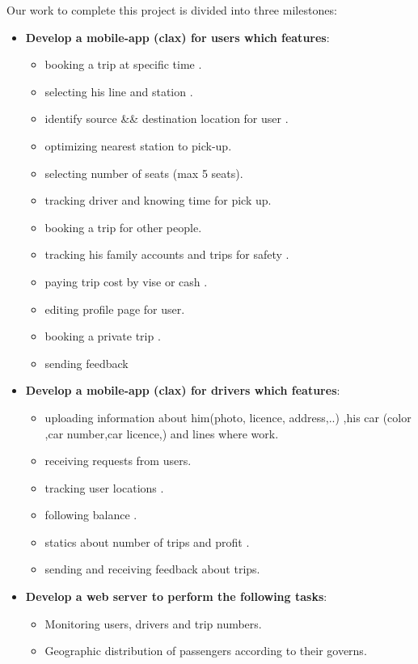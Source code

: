 Our work to complete this project is divided into three milestones:
\begin{itemize}

\item \textbf{Develop a mobile-app (clax) for users which features}:
    \begin{itemize}
    \item booking a trip at specific time .
    \item selecting his line and station .
    \item identify source && destination location for user .
    \item optimizing nearest station to pick-up. 
    \item selecting number of seats (max 5 seats).
    \item tracking driver and knowing time for pick up.
    \item booking a trip for other people.
    \item tracking his family accounts and trips for safety .
    \item paying trip cost by vise or cash .
    \item editing profile page for user.
    \item booking a private trip .
    \item sending feedback
    \end{itemize}
\item \textbf{Develop a mobile-app (clax) for drivers which features}:
    \begin{itemize}
        \item uploading information about him(photo, licence, address,..) ,his car (color ,car number,car licence,) and lines where work.
        \item receiving requests from users.
        \item tracking user locations .
        \item following balance .
        \item statics about number of trips and profit .
        \item sending and receiving feedback about trips.
    \end{itemize}
\item \textbf{Develop a web server to perform the following tasks}:
    \begin{itemize}
    \item Monitoring users, drivers and trip numbers.
    \item Geographic distribution of passengers according to their governs.

\end{itemize}
\end{itemize}
